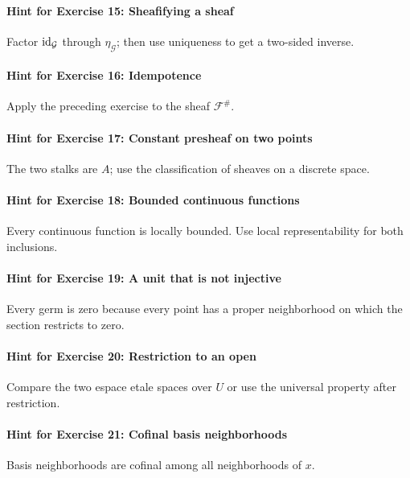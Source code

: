 \paragraph{Hint for Exercise 15: Sheafifying a sheaf}\mbox{}\par
Factor $\operatorname{id}_\mathcal G$ through $\eta_\mathcal G$; then use uniqueness to get a two-sided inverse.


\paragraph{Hint for Exercise 16: Idempotence}\mbox{}\par
Apply the preceding exercise to the sheaf $\mathcal F^\#$.


\paragraph{Hint for Exercise 17: Constant presheaf on two points}\mbox{}\par
The two stalks are $A$; use the classification of sheaves on a discrete space.


\paragraph{Hint for Exercise 18: Bounded continuous functions}\mbox{}\par
Every continuous function is locally bounded.  Use local representability for both inclusions.


\paragraph{Hint for Exercise 19: A unit that is not injective}\mbox{}\par
Every germ is zero because every point has a proper neighborhood on which the section restricts to zero.


\paragraph{Hint for Exercise 20: Restriction to an open}\mbox{}\par
Compare the two espace etale spaces over $U$ or use the universal property after restriction.


\paragraph{Hint for Exercise 21: Cofinal basis neighborhoods}\mbox{}\par
Basis neighborhoods are cofinal among all neighborhoods of $x$.


